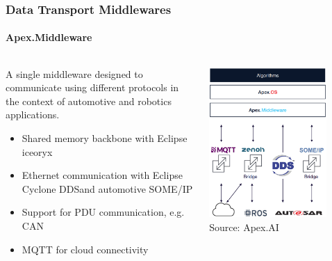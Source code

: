 \begin{frame}
\frametitle{Data Transport Middlewares}
\framesubtitle{Apex.Middleware}
\begin{columns}[]
    \begin{column}{0.6\textwidth}
        A single middleware designed to communicate using different protocols
        in the context of automotive and robotics applications.
        \begin{itemize}
            \item Shared memory backbone with Eclipse iceoryx\texttrademark\footnotemark[1]
            \item Ethernet communication with Eclipse Cyclone DDS\texttrademark\footnotemark[2]
                and automotive SOME/IP
            \item Support for PDU communication, e.g. CAN
            \item MQTT for cloud connectivity
        \end{itemize}
    \end{column}
    \begin{column}{0.4\textwidth}
        \centering
        \includegraphics[width=0.8\textwidth]{images/apex_middleware.png}\\
        \scriptsize Source: Apex.AI
    \end{column}
\end{columns}
\end{frame}


